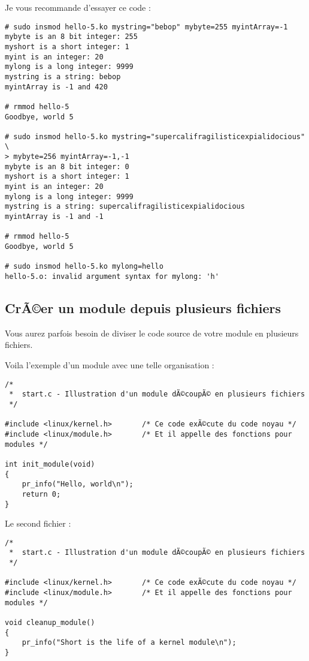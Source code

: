 \documentclass[11pt]{article}
\begin{document}
Je vous recommande d'essayer ce code :

\begin{verbatim}
# sudo insmod hello-5.ko mystring="bebop" mybyte=255 myintArray=-1
mybyte is an 8 bit integer: 255
myshort is a short integer: 1
myint is an integer: 20
mylong is a long integer: 9999
mystring is a string: bebop
myintArray is -1 and 420

# rmmod hello-5
Goodbye, world 5

# sudo insmod hello-5.ko mystring="supercalifragilisticexpialidocious" \
> mybyte=256 myintArray=-1,-1
mybyte is an 8 bit integer: 0
myshort is a short integer: 1
myint is an integer: 20
mylong is a long integer: 9999
mystring is a string: supercalifragilisticexpialidocious
myintArray is -1 and -1

# rmmod hello-5
Goodbye, world 5

# sudo insmod hello-5.ko mylong=hello
hello-5.o: invalid argument syntax for mylong: 'h'
\end{verbatim}

\subsection*{CrÃ©er un module depuis plusieurs fichiers}
\label{sec-4-6}

Vous aurez parfois besoin de diviser le code source de votre module en plusieurs fichiers.

Voila l'exemple d'un module avec une telle organisation :

\begin{verbatim}
/*
 *  start.c - Illustration d'un module dÃ©coupÃ© en plusieurs fichiers
 */

#include <linux/kernel.h>       /* Ce code exÃ©cute du code noyau */
#include <linux/module.h>       /* Et il appelle des fonctions pour modules */

int init_module(void)
{
    pr_info("Hello, world\n");
    return 0;
}
\end{verbatim}

Le second fichier :

\begin{verbatim}
/*
 *  start.c - Illustration d'un module dÃ©coupÃ© en plusieurs fichiers
 */

#include <linux/kernel.h>       /* Ce code exÃ©cute du code noyau */
#include <linux/module.h>       /* Et il appelle des fonctions pour modules */

void cleanup_module()
{
    pr_info("Short is the life of a kernel module\n");
}
\end{verbatim}
\end{document}
